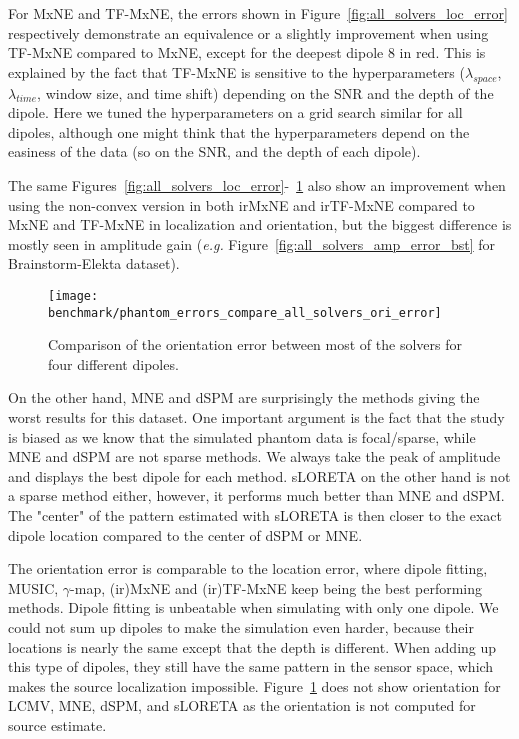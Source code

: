 For MxNE and TF-MxNE, the errors shown in Figure~\ref{fig:all_solvers_loc_error} respectively demonstrate an equivalence or a slightly improvement when using TF-MxNE compared to MxNE, except for the deepest dipole 8 in red. This is explained by the fact that TF-MxNE is sensitive to the hyperparameters ($\lambda_{space}$, $\lambda_{time}$, window size, and time shift) depending on the SNR and the depth of the dipole. Here we tuned the hyperparameters on a grid search similar for all dipoles, although one might think that the hyperparameters depend on the easiness of the data (so on the SNR, and the depth of each dipole).

The same Figures~\ref{fig:all_solvers_loc_error}-~\ref{fig:all_solvers_ori_error} also show an improvement when using the non-convex version in both irMxNE and irTF-MxNE compared to MxNE and TF-MxNE in localization and orientation, but the biggest difference is mostly seen in amplitude gain (\textit{e.g.} Figure~\ref{fig:all_solvers_amp_error_bst} for Brainstorm-Elekta dataset).

\begin{figure}[h!]
	\centering 
    \texttt{[image: benchmark/phantom\_errors\_compare\_all\_solvers\_ori\_error]}
    \caption{Comparison of the orientation error between most of the solvers for four different dipoles. \label{fig:all_solvers_ori_error}}
\end{figure}

On the other hand, MNE and dSPM are surprisingly the methods giving the worst results for this dataset. One important argument is the fact that the study is biased as we know that the simulated phantom data is focal/sparse, while MNE and dSPM are not sparse methods. We always take the peak of amplitude and displays the best dipole for each method. sLORETA on the other hand is not a sparse method either, however, it performs much better than MNE and dSPM. The "center" of the pattern estimated with sLORETA is then closer to the exact dipole location compared to the center of dSPM or MNE.

The orientation error is comparable to the location error, where dipole fitting, MUSIC, $\gamma$-map, (ir)MxNE and (ir)TF-MxNE keep being the best performing methods. Dipole fitting is unbeatable when simulating with only one dipole. We could not sum up dipoles to make the simulation even harder, because their locations is nearly the same except that the depth is different. When adding up this type of dipoles, they still have the same pattern in the sensor space, which makes the source localization impossible. Figure~\ref{fig:all_solvers_ori_error} does not show orientation for LCMV, MNE, dSPM, and sLORETA as the orientation is not computed for source estimate.

